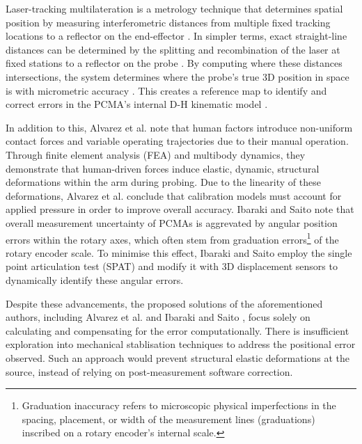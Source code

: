 Laser-tracking multilateration is a metrology technique that determines spatial position by measuring interferometric distances from multiple fixed tracking locations to a reflector on the end-effector \citep{Alvarez:2015}. In simpler terms, exact straight-line distances can be determined by the splitting and recombination of the laser at fixed stations to a reflector on the probe \citep{Alvarez:2015}. By computing where these distances intersections, the system determines where the probe's true 3D position in space is with micrometric accuracy \citep{Alvarez:2015}. This creates a reference map to identify and correct errors in the PCMA's internal D-H kinematic model \citep{Alvarez:2015}.

In addition to this, Alvarez et al. \citep{Alvarez:2015} note that human factors introduce non-uniform contact forces and variable operating trajectories due to their manual operation. Through finite element analysis (FEA) and multibody dynamics, they demonstrate that human-driven forces induce elastic, dynamic, structural deformations within the arm during probing. Due to the linearity of these deformations, Alvarez et al. \citep{Alvarez:2015} conclude that calibration models must account for applied pressure in order to improve overall accuracy. Ibaraki and Saito \citep{Ibaraki:2023} note that overall measurement uncertainty of PCMAs is aggrevated by angular position errors within the rotary axes, which often stem from graduation errors\footnote{Graduation inaccuracy refers to microscopic physical imperfections in the spacing, placement, or width of the measurement lines (graduations) inscribed on a rotary encoder's internal scale.} of the rotary encoder scale. To minimise this effect, Ibaraki and Saito \citep{Ibaraki:2023} employ the single point articulation test (SPAT) and modify it with 3D displacement sensors to dynamically identify these angular errors. 

Despite these advancements, the proposed solutions of the aforementioned authors, including Alvarez et al. \citep{Alvarez:2015} and Ibaraki and Saito \citep{Ibaraki:2023}, focus solely on calculating and compensating for the error computationally. There is insufficient exploration into mechanical stablisation techniques to address the positional error observed. Such an approach would prevent structural elastic deformations at the source, instead of relying on post-measurement software correction. 


